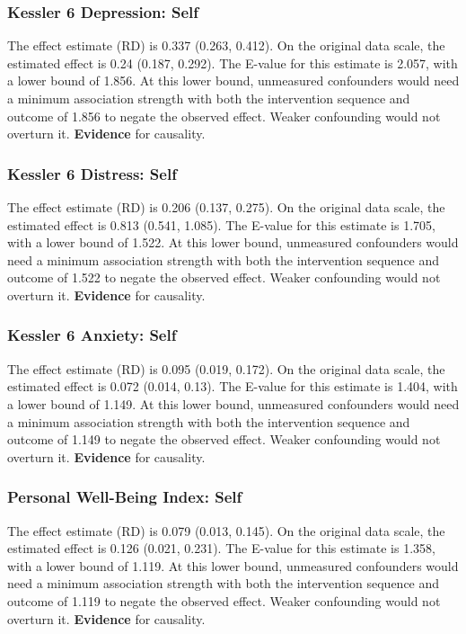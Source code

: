 \documentclass[
  singlecolumn]{article}
\begin{document}
\subsubsection{Kessler 6 Depression:
Self}\label{kessler-6-depression-self-18}

The effect estimate (RD) is 0.337 (0.263, 0.412). On the original data
scale, the estimated effect is 0.24 (0.187, 0.292). The E-value for this
estimate is 2.057, with a lower bound of 1.856. At this lower bound,
unmeasured confounders would need a minimum association strength with
both the intervention sequence and outcome of 1.856 to negate the
observed effect. Weaker confounding would not overturn it.
\textbf{Evidence} for causality.

\subsubsection{Kessler 6 Distress:
Self}\label{kessler-6-distress-self-18}

The effect estimate (RD) is 0.206 (0.137, 0.275). On the original data
scale, the estimated effect is 0.813 (0.541, 1.085). The E-value for
this estimate is 1.705, with a lower bound of 1.522. At this lower
bound, unmeasured confounders would need a minimum association strength
with both the intervention sequence and outcome of 1.522 to negate the
observed effect. Weaker confounding would not overturn it.
\textbf{Evidence} for causality.

\subsubsection{Kessler 6 Anxiety: Self}\label{kessler-6-anxiety-self-18}

The effect estimate (RD) is 0.095 (0.019, 0.172). On the original data
scale, the estimated effect is 0.072 (0.014, 0.13). The E-value for this
estimate is 1.404, with a lower bound of 1.149. At this lower bound,
unmeasured confounders would need a minimum association strength with
both the intervention sequence and outcome of 1.149 to negate the
observed effect. Weaker confounding would not overturn it.
\textbf{Evidence} for causality.

\subsubsection{Personal Well-Being Index:
Self}\label{personal-well-being-index-self-18}

The effect estimate (RD) is 0.079 (0.013, 0.145). On the original data
scale, the estimated effect is 0.126 (0.021, 0.231). The E-value for
this estimate is 1.358, with a lower bound of 1.119. At this lower
bound, unmeasured confounders would need a minimum association strength
with both the intervention sequence and outcome of 1.119 to negate the
observed effect. Weaker confounding would not overturn it.
\textbf{Evidence} for causality.
\end{document}
